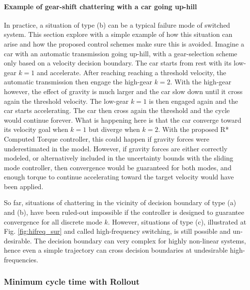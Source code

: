 \paragraph{Example of gear-shift chattering with a car going up-hill}

In practice, a situation of type (b) can be a typical failure mode of switched system. This section explore with a simple example of how this situation can arise and how the proposed control schemes make sure this is avoided. Imagine a car with an automatic transmission going up-hill, with a gear-selection scheme only based on a velocity decision boundary. The car starts from rest with its low-gear $k=1$ and accelerate. After reaching reaching a threshold velocity, the automatic transmission then engage the high-gear $k=2$. With the high-gear however, the effect of gravity is much larger and the car slow down until it cross again the threshold velocity. The low-gear $k=1$ is then engaged again and the car starts accelerating. The car then cross again the threshold and the cycle would continue forever. What is happening here is that the car converge toward its velocity goal when $k=1$ but diverge when $k=2$. With the proposed R* Computed Torque controller, this could happen if gravity forces were underestimated in the model. However, if gravity forces are either correctly modeled, or alternatively included in the uncertainty bounds with the sliding mode controller, then convergence would be guaranteed for both modes, and enough torque to continue accelerating toward the target velocity would have been applied. %

So far, situations of chattering in the vicinity of decision boundary of type (a) and (b), have been ruled-out impossible if the controller is designed to guarantee convergence for all discrete mode $k$. However, situations of type (c), illustrated at Fig. \ref{fig:hifreq_sur} and called high-frequency switching, is still possible and un-desirable. The decision boundary can very complex for highly non-linear systems, hence even a simple trajectory can cross decision boundaries at undesirable high-frequencies. 

\subsubsection{Minimum cycle time with Rollout}

